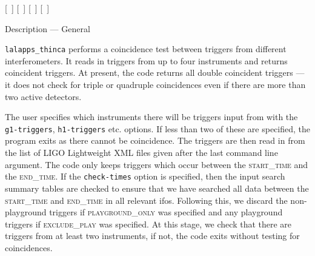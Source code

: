 \begin{entry}
  \newline \hspace*{0.5in}
[~]  \newline \hspace*{0.5in}
[~]  \newline \hspace*{0.5in}
[~]  \newline \hspace*{0.5in}
[~]  \newline \hspace*{0.5in}
\newline \hspace*{0.5in}
~ 
\newline \hspace*{0.5in}

\item[Description --- General] 

\verb$lalapps_thinca$ performs a coincidence test between triggers from
different interferometers.  It reads in triggers from up to four instruments
and returns coincident triggers.  At present, the code returns all double
coincident triggers --- it does not check for triple or quadruple coincidences
even if there are more than two active detectors.

The user specifies which instruments there will be triggers input from with
the \texttt{g1-triggers}, \texttt{h1-triggers} etc. options.  If less than two
of these are specified, the program exits as there cannot be coincidence.  The
triggers are then read in from the list of LIGO Lightweight XML files given
after the last command line argument.  The code only keeps triggers which
occur between the \textsc{start\_time} and the \textsc{end\_time}.  If the
\texttt{check-times} option is specified, then the input search summary tables
are checked to ensure that we have searched all data between the
\textsc{start\_time} and \textsc{end\_time} in all relevant ifos.  Following
this, we discard the non-playground triggers if \textsc{playground\_only} was
specified and any playground triggers if \textsc{exclude\_play} was specified.
At this stage, we check that there are triggers from at least two instruments,
if not, the code exits without testing for coincidences. 


\end{entry}
